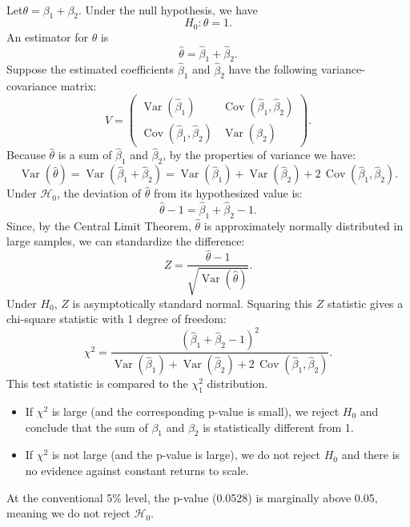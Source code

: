 \documentclass[a4paper,12pt]{article} %
\theoremstyle{nonitalic}
\newenvironment{solution}[1]
  {\renewcommand\theinnercustomsol{#1}\innercustomsol}
  {\endinnercustomsol}
\newcounter{solutionctr}
\renewcommand{\thesolutionctr}{(\alph{solutionctr})}
\newenvironment{autosolution}
  {\stepcounter{solutionctr}\begin{solution}{\thesolutionctr}}
  {\end{solution}}
\begin{document}
\begin{autosolution}
    \

    Let$\theta = \beta_1 + \beta_2$. Under the null hypothesis, we have
    \[
    H_0: \theta = 1.
    \]
    An estimator for $\theta$ is
    \[
    \hat{\theta} = \hat{\beta}_1 + \hat{\beta}_2.
    \]
    Suppose the estimated coefficients $\hat{\beta}_1$ and $\hat{\beta}_2$ have the following variance-covariance matrix:
    \[
    V = \begin{pmatrix}
    \operatorname{Var}(\hat{\beta}_1) & \operatorname{Cov}(\hat{\beta}_1, \hat{\beta}_2) \\
    \operatorname{Cov}(\hat{\beta}_1, \hat{\beta}_2) & \operatorname{Var}(\hat{\beta}_2)
    \end{pmatrix}.
    \]
    Because $\hat{\theta}$ is a sum of $\hat{\beta}_1$ and $\hat{\beta}_2$, by the properties of variance we have:
    \[
    \operatorname{Var}(\hat{\theta}) = \operatorname{Var}(\hat{\beta}_1 + \hat{\beta}_2) = \operatorname{Var}(\hat{\beta}_1) + \operatorname{Var}(\hat{\beta}_2) + 2\,\operatorname{Cov}(\hat{\beta}_1, \hat{\beta}_2).
    \]
    Under $\mathcal{H}_0$, the deviation of $\hat{\theta}$ from its hypothesized value is:
    \[
    \hat{\theta} - 1 = \hat{\beta}_1 + \hat{\beta}_2 - 1.
    \]
    Since, by the Central Limit Theorem, $\hat{\theta}$ is approximately normally distributed in large samples, we can standardize the difference:
    \[
    Z = \frac{\hat{\theta} - 1}{\sqrt{\operatorname{Var}(\hat{\theta})}}.
    \]
    Under $H_0$, $Z$ is asymptotically standard normal. Squaring this $Z$ statistic gives a chi-square statistic with 1 degree of freedom:
    \[
    \chi^2 = \frac{(\hat{\beta}_1 + \hat{\beta}_2 - 1)^2}{\operatorname{Var}(\hat{\beta}_1) + \operatorname{Var}(\hat{\beta}_2) + 2\,\operatorname{Cov}(\hat{\beta}_1, \hat{\beta}_2)}.
    \]
    This test statistic is compared to the $\chi^2_1$ distribution.
    \begin{itemize}
        \item If $\chi^2$ is large (and the corresponding p-value is small), we reject $H_0$ and conclude that the sum of $\beta_1$ and $\beta_2$ is statistically different from 1.  
        \item If $\chi^2$ is not large (and the p-value is large), we do not reject $H_0$ and there is no evidence against constant returns to scale.
    \end{itemize}

    At the conventional 5\% level, the p-value (0.0528) is marginally above 0.05, meaning we do not reject $\mathcal{H}_0$.
\end{autosolution}
\end{document}
